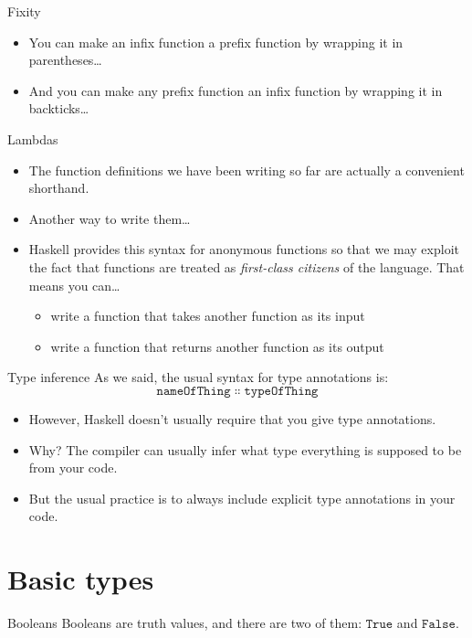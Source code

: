 \documentclass[presentation]{beamer}
\begin{document}
\begin{frame}[label={sec:org8a7eab7}]{Fixity}
\pause
\begin{itemize}[<+->]
\item You can make an infix function a prefix function by wrapping it in
parentheses\ldots
\item And you can make any prefix function an infix function by wrapping it in
backticks\ldots
\end{itemize}
\end{frame}

\begin{frame}[label={sec:org86e0428}]{Lambdas}
\pause
\begin{itemize}[<+->]
\item The function definitions we have been writing so far are actually a
convenient shorthand.
\item Another way to write them\ldots
\item Haskell provides this syntax for anonymous functions so that we may
exploit the fact that functions are treated as \emph{first-class citizens} of
the language. \pause That means you can\ldots
\pause
\begin{itemize}[<+->]
\item write a function that takes another function as its input
\item write a function that returns another function as its output
\end{itemize}
\end{itemize}
\end{frame}

\begin{frame}[label={sec:org4dcbb3a}]{Type inference}
As we said, the usual syntax for type annotations is:
$$\mathtt{nameOfThing} ∷ \mathtt{typeOfThing}$$
\pause
\begin{itemize}[<+->]
\item However, Haskell doesn't usually require that you give type annotations.
\item Why? The compiler can usually infer what type everything is supposed to be
from your code.
\item But the usual practice is to always include explicit type annotations in
your code.
\end{itemize}
\end{frame}

\section{Basic types}
\label{sec:org7825c97}
\begin{frame}[label={sec:org9ceb32c}]{Booleans}
Booleans are truth values, and there are two of them: \(\mathtt{True}\) and
\(\mathtt{False}\).
\end{frame}
\end{document}
